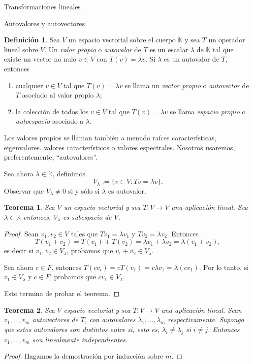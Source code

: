 \documentclass[a4paper,12pt,twoside,spanish]{amsbook}
\newtheorem{teorema}{Teorema}[section]
\theoremstyle{definition}
\newtheorem{definicion}{Definici\'on}[section]
\theoremstyle{remark}
\newcommand{\K}{\mathbb K}
\begin{document}
\begin{chapter}{Transformaciones lineales}
\begin{section}{Autovalores y autovectores}
		\begin{definicion}
			Sea $V$ un espacio vectorial sobre el cuerpo $\K$ y sea $T$ un operador lineal sobre $V$. Un \textit{valor propio} o \textit{autovalor} de $T$ es un escalar $\lambda$ de $\K$ tal que existe un vector no nulo $v \in V$ con $T(v) = \lambda v$. Si $\lambda$ es un autovalor de $T$, entonces
			\begin{enumerate}
				\item  cualquier  $v \in V$ tal que $T(v) = \lambda v$  se llama un \textit{vector propio} o  \textit{autovector} de $T$ asociado al valor propio $\lambda$;
				\item la colección de todos los $v \in V$ tal que $T(v) = \lambda v$  se llama \textit{espacio propio} o \textit{autoespacio} 	asociado a $\lambda$.
			\end{enumerate}
			
			Los valores propios se llaman también a menudo raíces características, eigenvalores. valores característicos o valores espectrales. Nosotros usaremos, preferentemente, ``autovalores''.
			
			Sea ahora $\lambda \in \K$, definimos
			$$
			V_\lambda := \{v \in V: Tv = \lambda v \}.
			$$
			Observar que $V_\lambda \ne 0$ si y sólo si $\lambda$ es autovalor. 
		\end{definicion}
		
		
		\begin{teorema}
			Sea $V$ un espacio vectorial y sea $T:V \to V$ una aplicación lineal. Sea $\lambda \in \K$ entonces, $V_\lambda$  es subespacio de $V$.
		\end{teorema}
		\begin{proof}
			Sean $v_1,v_2 \in V$ tales que $Tv_1 = \lambda v_1$ y $Tv_2 = \lambda v_2$. Entonces
			$$
			T(v_1+v_2) = T(v_1)+ T(v_2) = \lambda v_1 + \lambda v_2 = \lambda (v_1 + v_2),
			$$
			es decir si  $v_1,v_2 \in V_\lambda$, probamos que $v_1+v_2 \in V_\lambda$. 
			
			Sea ahora $c \in F$, entonces $T(cv_i) = cT(v_1) = c\lambda v_1 = \lambda (cv_1)$. Por lo tanto, si  $v_1\in V_\lambda$ y $c \in F$, probamos que $cv_1 \in V_\lambda$.
			
			Esto termina de probar el teorema.
		\end{proof}

		
		
		\begin{teorema}
			Sea $V$ espacio vectorial y sea $T: V \to V$ una aplicación lineal.  Sean $v_1,\ldots,v_m$ autovectores de $T$, con autovalores $\lambda_1,\ldots,\lambda_m$ respectivamente. Suponga que estos  autovalores son distintos entre si, esto es, $\lambda_i \ne \lambda_j$ si $i \ne j$. Entonces $v_1,\ldots,v_m$ son linealmente independientes.
		\end{teorema}
		\begin{proof}
			Hagamos la demostración por inducción sobre $m$.
			

\end{proof}
\end{section}
\end{chapter}
\end{document}
